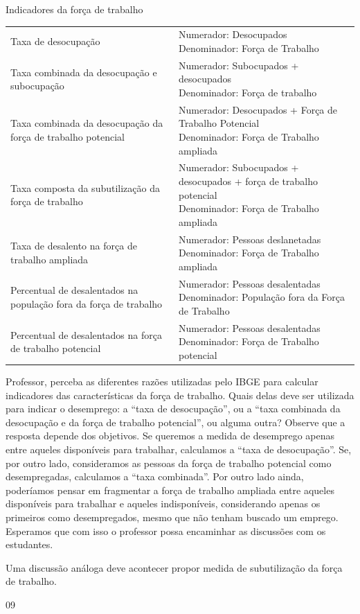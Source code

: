\begin{sugestions}{Indicadores da força de trabalho}
{\begin{table}[H]
  \begin{tabu} to 
  \hline
   &  \\
  \hline
  Taxa de desocupação & \parbox{\linewidth}{Numerador: Desocupados \\ Denominador: Força de Trabalho} \\
  \hline
  Taxa combinada da desocupação e subocupação & \parbox{\linewidth}{Numerador: Subocupados + desocupados \\ Denominador: Força de trabalho} \\
  \hline
  Taxa combinada da desocupação da força de trabalho potencial & \parbox{\linewidth}{Numerador: Desocupados + Força de Trabalho Potencial  \\ Denominador: Força de Trabalho ampliada} \\
  \hline
  Taxa composta da subutilização da força de trabalho & \parbox{\linewidth}{Numerador: Subocupados + desocupados + força de trabalho potencial \\ Denominador: Força de Trabalho ampliada} \\
  \hline
  Taxa de desalento na força de trabalho ampliada & \parbox{\linewidth}{Numerador: Pessoas deslanetadas \\ Denominador: Força de Trabalho ampliada} \\
  \hline
  Percentual de desalentados na população fora da força de trabalho & \parbox{\linewidth}{Numerador: Pessoas desalentadas \\ Denominador: População fora da Força de Trabalho} \\
  \hline
  Percentual de desalentados na força de trabalho potencial & \parbox{\linewidth}{Numerador: Pessoas desalentadas \\ Denominador: Força de Trabalho potencial} \\
  \hline
  \end{tabu}
  \end{table}

  Professor, perceba as diferentes razões utilizadas pelo IBGE para calcular indicadores das características da força de trabalho. Quais delas deve ser utilizada para indicar o desemprego: a “taxa de desocupação”, ou a “taxa combinada da desocupação e da força de trabalho potencial”, ou alguma outra? Observe que a resposta depende dos objetivos. Se queremos a medida de desemprego apenas entre aqueles disponíveis para trabalhar, calculamos a “taxa de desocupação”. Se, por outro lado, consideramos as pessoas da força de trabalho potencial como desempregadas, calculamos a “taxa combinada”. Por outro lado ainda, poderíamos pensar em fragmentar a força de trabalho ampliada entre aqueles disponíveis para trabalhar e aqueles indisponíveis, considerando apenas os primeiros como desempregados, mesmo que não tenham buscado um emprego. Esperamos que com isso o professor possa encaminhar as discussões com os estudantes.

  Uma discussão análoga deve acontecer propor medida de subutilização da força de trabalho.

}{0}{9}
\end{sugestions}

